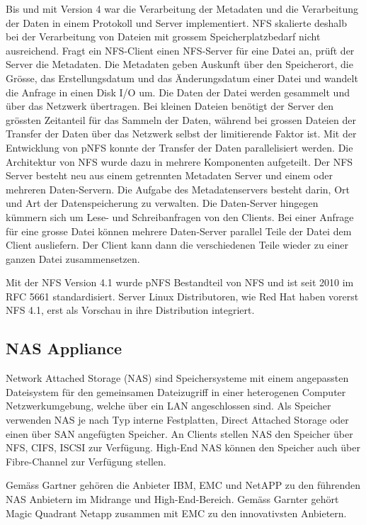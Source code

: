 Bis und mit Version 4 war die Verarbeitung der Metadaten und die Verarbeitung der Daten in einem Protokoll und Server implementiert. NFS skalierte deshalb bei der Verarbeitung von Dateien mit grossem Speicherplatzbedarf nicht ausreichend. Fragt ein NFS-Client einen NFS-Server für eine Datei an, prüft der Server die Metadaten. Die Metadaten geben Auskunft über den Speicherort, die Grösse, das Erstellungsdatum und das Änderungsdatum einer Datei und wandelt die Anfrage in einen Disk I/O um. Die Daten der Datei werden gesammelt und über das Netzwerk übertragen. Bei kleinen Dateien benötigt der Server den grössten Zeitanteil für das Sammeln der Daten, während bei grossen Dateien der Transfer der Daten über das Netzwerk selbst der limitierende Faktor ist.
Mit der Entwicklung von pNFS konnte der Transfer der Daten parallelisiert werden. Die Architektur von NFS wurde dazu in mehrere Komponenten aufgeteilt. Der NFS Server besteht neu aus einem getrennten Metadaten Server und einem oder mehreren Daten-Servern. Die Aufgabe des Metadatenservers besteht darin, Ort und Art der Datenspeicherung zu verwalten. Die Daten-Server hingegen kümmern sich um Lese- und Schreibanfragen von den Clients.
Bei einer Anfrage für eine grosse Datei können mehrere Daten-Server parallel Teile der Datei dem Client ausliefern. Der Client kann dann die verschiedenen Teile wieder zu einer ganzen Datei zusammensetzen. \cite{Shepler2010}\cite{Group2010}

Mit der NFS Version 4.1 wurde pNFS Bestandteil von NFS und ist seit 2010 im \gls{RFC} 5661 standardisiert. Server Linux Distributoren, wie Red Hat haben vorerst NFS 4.1, erst als Vorschau in ihre Distribution integriert. \cite{EastJacquelynnMichaelHidep-Smith2011}




\subsection{NAS Appliance}

Network Attached Storage (NAS) sind Speichersysteme mit einem angepassten Dateisystem für den gemeinsamen Dateizugriff in einer heterogenen Computer Netzwerkumgebung, welche über ein LAN angeschlossen sind. Als Speicher verwenden NAS je nach Typ interne Festplatten, Direct Attached Storage oder einen über SAN angefügten Speicher.
An Clients stellen NAS den Speicher über NFS, CIFS, ISCSI zur Verfügung. High-End NAS können den Speicher auch über Fibre-Channel zur Verfügung stellen.

Gemäss Gartner gehören die Anbieter \gls{IBM}, \gls{EMC} und NetAPP zu den führenden NAS Anbietern im Midrange und High-End-Bereich. Gemäss Garnter gehört Magic Quadrant Netapp zusammen mit EMC zu den innovativsten Anbietern.

